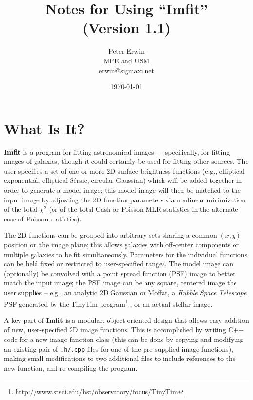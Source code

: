\documentclass[10pt,a4paper,article]{memoir}
\newcommand{\imfit}{\textbf{Imfit}}
\newcommand{\Imfit}{\textbf{Imfit}}
\newcommand{\chisquare}{\ensuremath{\chi^{2}}}
\newcommand{\versionnum}{1.1}
\begin{document}
\title{
  Notes for Using ``Imfit'' \\
  (Version \versionnum{})
}
\author{
  Peter Erwin\\
  MPE and USM\\
  \href{mailto:erwin@sigmaxi.net}{erwin@sigmaxi.net}
}
\date{\today}  %

\maketitle

\tableofcontents


\chapter{What Is It?}

\Imfit{} is a program for fitting astronomical images --- specifically,
for fitting images of galaxies, though it could certainly be used for
fitting other sources. The user specifies a set of one or more 2D
surface-brightness functions (e.g., elliptical exponential, elliptical
S\'ersic, circular Gaussian) which will be added together in order to
generate a model image; this model image will then be matched to the
input image by adjusting the 2D function parameters via nonlinear
minimization of the total \chisquare{} (or of the total Cash or
Poisson-MLR statistics in the alternate case of Poisson statistics).

The 2D functions can be grouped into arbitrary sets sharing a common $(x,y)$
position on the image plane; this allows galaxies with off-center components
or multiple galaxies to be fit simultaneously. Parameters for the individual
functions can be held fixed or restricted to user-specified ranges. The
model image can (optionally) be convolved with a point spread
function (PSF) image to better match the input image; the PSF image can
be any square, centered image the user supplies -- e.g., an analytic 2D Gaussian
or Moffat, a \textit{Hubble Space Telescope} PSF generated by the TinyTim
program\footnote{\url{http://www.stsci.edu/hst/observatory/focus/TinyTim}} \citep{krist95}, 
or an actual stellar image.

A key part of \imfit{} is a modular, object-oriented design that allows easy
addition of new, user-specified 2D image functions. This is accomplished by
writing C++ code for a new image-function class (this can be done by copying and
modifying an existing pair of \texttt{.h/.cpp} files for one of the pre-supplied
image functions), making small modifications to two additional files to include
references to the new function, and re-compiling the program.
\end{document}
